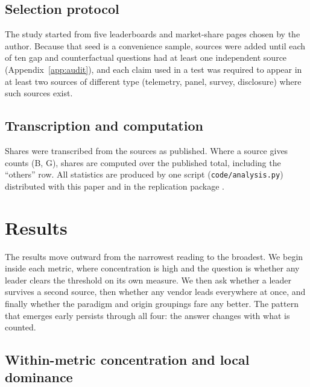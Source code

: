 \documentclass[11pt]{article}
\begin{document}
\subsection{Selection protocol} The study started from five leaderboards and market-share pages chosen by the author. Because that seed is a convenience sample, sources were added until each of ten gap and counterfactual questions had at least one independent source (Appendix~\ref{app:audit}), and each claim used in a test was required to appear in at least two sources of different type (telemetry, panel, survey, disclosure) where such sources exist.

\subsection{Transcription and computation} Shares were transcribed from the sources as published. Where a source gives counts (B, G), shares are computed over the published total, including the ``others'' row. All statistics are produced by one script (\texttt{code/analysis.py}) distributed with this paper and in the replication package \cite{oliveira2026repo}.

\section{Results}

The results move outward from the narrowest reading to the broadest. We begin inside each metric, where concentration is high and the question is whether any leader clears the threshold on its own measure. We then ask whether a leader survives a second source, then whether any vendor leads everywhere at once, and finally whether the paradigm and origin groupings fare any better. The pattern that emerges early persists through all four: the answer changes with what is counted.

\subsection{Within-metric concentration and local dominance}
\end{document}
